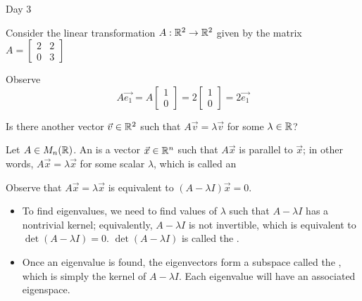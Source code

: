 
\begin{applicationActivities}{Day 3}

\begin{activity}
Consider the linear transformation $A : \mathbb{R}^2 \rightarrow \mathbb{R}^2$ given by the matrix $A = \begin{bmatrix} 2 & 2 \\ 0 & 3 \end{bmatrix}$

\begin{center}
\end{center}
Observe $$A\vec{e_1} = A\begin{bmatrix}1 \\ 0 \end{bmatrix} = 2 \begin{bmatrix}1 \\ 0 \end{bmatrix} = 2 \vec{e_1}$$

Is there another vector $\vec{v} \in \mathbb{R}^2$ such that $A\vec{v}=\lambda \vec{v}$ for some $\lambda \in \mathbb{R}$?
\end{activity}

\begin{definition}Let $A \in M_n(\mathbb{R})$.
An  is a vector $\vec{x} \in \mathbb{R}^n$ such that $A\vec{x}$ is parallel to $\vec{x}$; in other words, $A\vec{x}=\lambda \vec{x}$ for some scalar $\lambda$, which is called an 
\end{definition}

\begin{observation}
Observe that $A\vec{x}=\lambda \vec{x}$ is equivalent to $(A-\lambda I)\vec{x} = 0$.
\begin{itemize}
\item To find eigenvalues, we need to find values of $\lambda$ such that $A-\lambda I$ has a nontrivial kernel; equivalently, $A-\lambda I$ is not invertible, which is equivalent to $\det(A-\lambda I)=0$.  $\det(A-\lambda I)$ is called the .
\item Once an eigenvalue is found, the eigenvectors form a subspace called the , which is simply the kernel of $A-\lambda I$.  Each eigenvalue will have an associated eigenspace.
\end{itemize}
\end{observation}


\end{applicationActivities}
